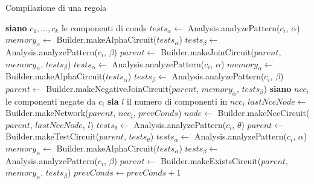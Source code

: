 

\begin{algorithm}
\caption{Compilazione di una regola}\label{alg:builder-makeNetwork}
\begin{algorithmic}
\State \textbf{siano} $c_1,\dots,c_k$ le componenti di conds
	    \State $tests_\alpha\gets$ Analysis.analyzePattern($c_i$, $\alpha$)
	    \State $memory_\alpha\gets$ Builder.makeAlphaCircuit($tests_\alpha$)
	    \State $tests_\beta\gets$ Analysis.analyzePattern($c_i$, $\beta$)
	    \State $parent\gets$ Builder.makeJoinCircuit($parent$, $memory_\alpha$, $tests_\beta$)
	    \State $tests_\alpha\gets$ Analysis.analyzePattern($c_i$, $\alpha$)
	    \State $memory_\alpha\gets$ Builder.makeAlphaCircuit($tests_\alpha$)
	    \State $tests_\beta\gets$ Analysis.analyzePattern($c_i$, $\beta$)
	    \State $parent\gets$ Builder.makeNegativeJoinCircuit($parent$, $memory_\alpha$, $tests_\beta$)
		\State \textbf{siano} $ncc_i$ le componenti negate da $c_i$
		\State \textbf{sia} $l$ il numero di componenti in $ncc_i$
	    \State $lastNccNode\gets$ Builder.makeNetwork($parent$, $ncc_i$, $prevConds$)
	    \State $node\gets$ Builder.makeNccCircuit($parent$, $lastNccNode$, $l$)
		\State $tests_\theta\gets$ Analysis.analyzePattern($c_i$, $\theta$)
		\State $parent\gets$ Builder.makeTestCircuit($parent$, $tests_\theta$)	
	    \State $tests_\alpha\gets$ Analysis.analyzePattern($c_i$, $\alpha$)
	    \State $memory_\alpha\gets$ Builder.makeAlphaCircuit($tests_\alpha$)
	    \State $tests_\beta\gets$ Analysis.analyzePattern($c_i$, $\beta$)
	    \State $parent\gets$ Builder.makeExistsCircuit($parent$, $memory_\alpha$, $tests_\beta$)
	\EndIf
	\State $prevConds\gets prevConds + 1$
\EndFor
\State {}
\EndFunction
\end{algorithmic}
\end{algorithm}

